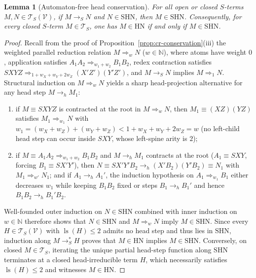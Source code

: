 \documentclass[11pt,reqno]{amsart}
\numberwithin{equation}{section}
\theoremstyle{plain}
\newtheorem{lemma}[theorem]{Lemma}
\theoremstyle{definition}
\theoremstyle{remark}
\DeclareMathOperator{\ls}{ls}
\newcommand{\TS}{\mathcal{T}_S}
\newcommand{\TSV}{\mathcal{T}_S(\mathcal{V})}
\newcommand{\HN}{\mathrm{HN}}
\newcommand{\redS}{\to_S}
\newcommand{\redSs}{\to_S^*}
\begin{document}
\begin{lemma}[Automaton-free head conservation]\label{lem:head-conservation}
For all open or closed $S$-terms $M, N \in \TSV$, if $M \redS N$ and $N \in \mathrm{SHN}$, then $M \in \mathrm{SHN}$. Consequently, for every closed $S$-term $M \in \TS$, one has $M \in \HN$ if and only if $M \in \mathrm{SHN}$.
\end{lemma}

\begin{proof}
Recall from the proof of Proposition~\ref{prop:cr-conservation}(iii) the weighted parallel reduction relation $M \Rightarrow_w N$ ($w \in \mathbb{N}$), where atoms have weight $0$, application satisfies $A_1 A_2 \Rightarrow_{w_1 + w_2} B_1 B_2$, redex contraction satisfies $S X Y Z \Rightarrow_{1 + w_X + w_Y + 2 w_Z} (X' Z')(Y' Z')$, and $M \redS N$ implies $M \Rightarrow_1 N$. Structural induction on $M \Rightarrow_w N$ yields a sharp head-projection alternative for any head step $M \to_h M_1$:
\begin{enumerate}[label=(\roman*),leftmargin=2.2em]
  \item if $M \equiv S X Y Z$ is contracted at the root in $M \Rightarrow_w N$, then $M_1 \equiv (X Z)(Y Z)$ satisfies $M_1 \Rightarrow_{w_1} N$ with $w_1 = (w_X + w_Z) + (w_Y + w_Z) < 1 + w_X + w_Y + 2 w_Z = w$ (no left-child head step can occur inside $S X Y$, whose left-spine arity is $2$);
  \item if $M \equiv A_1 A_2 \Rightarrow_{w_1 + w_2} B_1 B_2$ and $M \to_h M_1$ contracts at the root ($A_1 \equiv S X Y$, forcing $B_1 \equiv S X' Y'$), then $N \equiv S X' Y' B_2 \to_h (X' B_2)(Y' B_2) \equiv N_1$ with $M_1 \Rightarrow_{w'} N_1$; and if $A_1 \to_h A_1'$, the induction hypothesis on $A_1 \Rightarrow_{w_1} B_1$ either decreases $w_1$ while keeping $B_1 B_2$ fixed or steps $B_1 \to_h B_1'$ and hence $B_1 B_2 \to_h B_1' B_2$.
\end{enumerate}
Well-founded outer induction on $N \in \mathrm{SHN}$ combined with inner induction on $w \in \mathbb{N}$ therefore shows that $N \in \mathrm{SHN}$ and $M \Rightarrow_w N$ imply $M \in \mathrm{SHN}$. Since every $H \in \TSV$ with $\ls(H) \le 2$ admits no head step and thus lies in $\mathrm{SHN}$, induction along $M \redSs H$ proves that $M \in \HN$ implies $M \in \mathrm{SHN}$. Conversely, on closed $M \in \TS$, iterating the unique partial head-step function along $\mathrm{SHN}$ terminates at a closed head-irreducible term $H$, which necessarily satisfies $\ls(H) \le 2$ and witnesses $M \in \HN$.
\end{proof}
\end{document}
